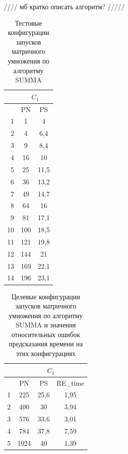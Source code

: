 			//// мб кратко описать алгоритм? /////

			\begin{table}
				\begin{tabular}{|r|c|c|}
					\hline
					            & \multicolumn{2}{c|}{\(C_1\)} \\ \hline
					\textnumero & PN  & PS                     \\ \hline
					1           & 1   & 4                      \\ \hline
					2           & 4   & 6,4                    \\ \hline
					3           & 9   & 8,4                    \\ \hline
					4           & 16  & 10                     \\ \hline
					5           & 25  & 11,5                   \\ \hline
					6           & 36  & 13,2                   \\ \hline
					7           & 49  & 14,7                   \\ \hline
					8           & 64  & 16                     \\ \hline
					9           & 81  & 17,1                   \\ \hline
					10          & 100 & 18,5                   \\ \hline
					11          & 121 & 19,8                   \\ \hline
					12          & 144 & 21                     \\ \hline
					13          & 169 & 22,1                   \\ \hline
					14          & 196 & 23,1                   \\ \hline
				\end{tabular}
				\caption{Тестовые конфигурации запусков матричного умножения по алгоритму SUMMA}
				\label{test_SUMMA}
			\end{table}

		\begin{table}
			\begin{tabular}{|r|c|c|c|}
			\hline
			            & \multicolumn{3}{|c|}{\(C_1\)} \\ \hline
			\textnumero & PN   & PS   & RE\_time        \\ \hline
			1           & 225  & 25,6 & 1,95            \\ \hline
			2           & 400  & 30   & 3,94            \\ \hline
			3           & 576  & 33,6 & 3,01            \\ \hline
			4           & 784  & 37,8 & 7,59            \\ \hline
			5           & 1024 & 40   & 1,39            \\ \hline
			\end{tabular}
			\caption{Целевые конфигурации запусков матричного умножения по алгоритму SUMMA и значения относительных ошибок предсказания времени на этих конфигурациях}
			\label{target_SUMMA}
		\end{table}

